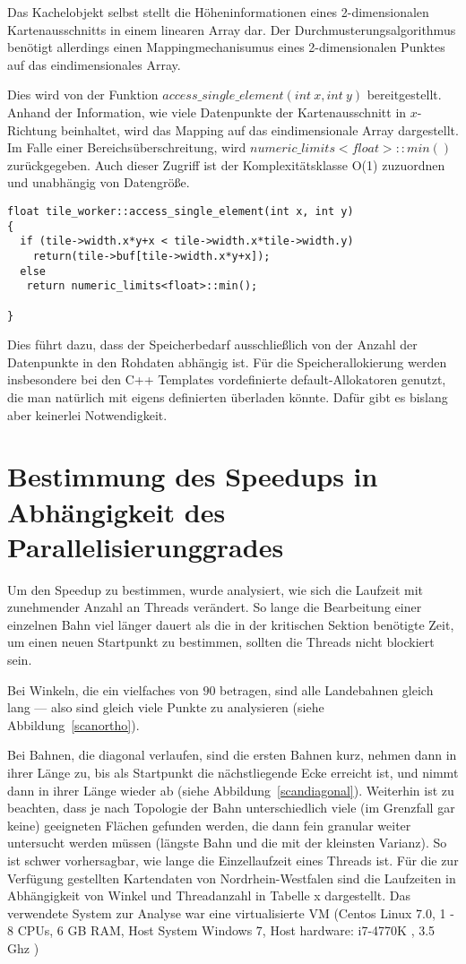 \documentclass[10pt,a4paper]{report}
\begin{document}
Das Kachelobjekt selbst stellt die Höheninformationen eines 2-dimensionalen Kartenausschnitts in einem linearen Array dar. Der Durchmusterungsalgorithmus benötigt allerdings einen Mappingmechanisumus eines 2-dimensionalen Punktes auf das eindimensionales Array.

Dies wird von der Funktion $access\_single\_element(int\ x, int\ y)$ bereitgestellt. Anhand der Information, wie viele Datenpunkte der Kartenausschnitt in $x$-Richtung beinhaltet, wird das Mapping auf das eindimensionale Array dargestellt. Im Falle einer Bereichsüberschreitung, wird $numeric\_limits<float>::min()$ zurückgegeben.
Auch dieser Zugriff ist der Komplexitätsklasse O(1) zuzuordnen und unabhängig von Datengröße.

\begin{lstlisting}
float tile_worker::access_single_element(int x, int y)
{
  if (tile->width.x*y+x < tile->width.x*tile->width.y)
    return(tile->buf[tile->width.x*y+x]);
  else
   return numeric_limits<float>::min();

}
\end{lstlisting}

Dies führt dazu, dass der Speicherbedarf ausschließlich von der Anzahl der Datenpunkte in den Rohdaten abhängig ist. Für die Speicherallokierung werden insbesondere bei den C++ Templates vordefinierte default-Allokatoren genutzt, die man natürlich mit eigens definierten überladen könnte. Dafür gibt es bislang aber keinerlei Notwendigkeit.
 


\section{Bestimmung des Speedups in Abhängigkeit des Parallelisierunggrades}

Um den Speedup zu bestimmen, wurde analysiert, wie sich die Laufzeit mit zunehmender Anzahl an Threads verändert. So lange die Bearbeitung einer einzelnen Bahn viel länger dauert als die in der kritischen Sektion benötigte Zeit, um einen neuen Startpunkt zu bestimmen, sollten die Threads nicht blockiert sein.

Bei Winkeln, die ein vielfaches von $90$ betragen, sind alle Landebahnen gleich lang --- also sind gleich viele Punkte zu analysieren (siehe Abbildung~\ref{scanortho}).

Bei Bahnen, die diagonal verlaufen, sind die ersten Bahnen kurz, nehmen dann in ihrer Länge zu, bis als Startpunkt die nächstliegende Ecke erreicht ist, und nimmt dann in ihrer Länge wieder ab (siehe Abbildung~\ref{scandiagonal}). 
Weiterhin ist zu beachten, dass je nach Topologie der Bahn unterschiedlich viele (im Grenzfall gar keine) geeigneten Flächen gefunden werden, die dann fein granular weiter untersucht werden müssen (längste Bahn und die mit der kleinsten Varianz). So ist schwer vorhersagbar, wie lange die Einzellaufzeit eines Threads ist.
Für die zur Verfügung gestellten Kartendaten von Nordrhein-Westfalen sind die Laufzeiten in Abhängigkeit von Winkel und Threadanzahl in Tabelle x dargestellt. Das verwendete System zur Analyse war eine virtualisierte VM (Centos Linux 7.0, 1 - 8 CPUs, 6 GB RAM, Host System Windows 7, Host hardware: i7-4770K , 3.5 Ghz ) 
\end{document}
